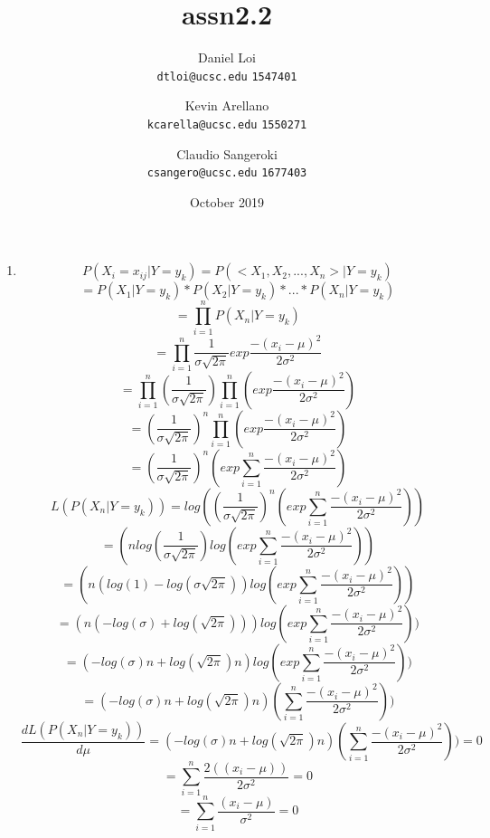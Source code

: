 \documentclass[12pt]{article}
\title{assn2.2}
\author{
  Daniel Loi\\
  \texttt{dtloi@ucsc.edu}
  \texttt{1547401}
  \and
  Kevin Arellano\\
  \texttt{kcarella@ucsc.edu}
  \texttt{1550271}
  \and
  Claudio Sangeroki\\
  \texttt{csangero@ucsc.edu}
  \texttt{1677403}
}
\date{October 2019}
\begin{document}
\maketitle

\begin{enumerate}
    \item 
    \[P(X_{i} = x_{ij} | Y = y_k) = P(<X_1, X_2, ..., X_n> | Y = y_k) \]
    \[= P(X_1 | Y = y_k) * P(X_2 | Y = y_k) *...*P(X_n | Y = y_k) \]
    \[=\prod_{i=1}^{n}P(X_n | Y = y_k)\]
    \[=\prod_{i=1}^{n}\frac{1}{\sigma\sqrt{2\pi}}exp{\frac{-(x_{i}-\mu)^{2}}{2\sigma^{2}}}\]
    \[=\prod_{i=1}^{n}(\frac{1}{\sigma\sqrt{2\pi}})\prod_{i=1}^{n}(exp{\frac{-(x_{i}-\mu)^{2}}{2\sigma^{2}}})\]
    \[=(\frac{1}{\sigma\sqrt{2\pi}})^n\prod_{i=1}^{n}(exp{\frac{-(x_{i}-\mu)^{2}}{2\sigma^{2}}})\]
    \[=(\frac{1}{\sigma\sqrt{2\pi}})^n(exp\sum_{i=1}^{n}{\frac{-(x_{i}-\mu)^{2}}{2\sigma^{2}}})\]
    \[L(P(X_n | Y = y_k))=log((\frac{1}{\sigma\sqrt{2\pi}})^n(exp\sum_{i=1}^{n}{\frac{-(x_{i}-\mu)^{2}}{2\sigma^{2}}}))\]
    \[=(nlog(\frac{1}{\sigma\sqrt{2\pi}})log(exp\sum_{i=1}^{n}{\frac{-(x_{i}-\mu)^{2}}{2\sigma^{2}}}))\]
    \[=(n(log(1)-log(\sigma\sqrt{2\pi}))log(exp\sum_{i=1}^{n}{\frac{-(x_{i}-\mu)^{2}}{2\sigma^{2}}}))\]
    \[=(n(-log(\sigma)+log(\sqrt{2\pi})))log(exp\sum_{i=1}^{n}{\frac{-(x_{i}-\mu)^{2}}{2\sigma^{2}}}))\]
    \[=(-log(\sigma)n+log(\sqrt{2\pi})n)log(exp\sum_{i=1}^{n}{\frac{-(x_{i}-\mu)^{2}}{2\sigma^{2}}}))\]
    \[=(-log(\sigma)n+log(\sqrt{2\pi})n)(\sum_{i=1}^{n}{\frac{-(x_{i}-\mu)^{2}}{2\sigma^{2}}}))\]
    \[\frac{dL(P(X_n | Y = y_k))}{d\mu}=(-log(\sigma)n+log(\sqrt{2\pi})n)(\sum_{i=1}^{n}{\frac{-(x_{i}-\mu)^{2}}{2\sigma^{2}}}))=0\]
    \[=\sum_{i=1}^{n}{\frac{2((x_{i}-\mu))}{2\sigma^{2}}}=0\]
    \[=\sum_{i=1}^{n}{\frac{(x_{i}-\mu)}{\sigma^{2}}}=0\]
    
    
    
\end{enumerate}
    
\end{document}
